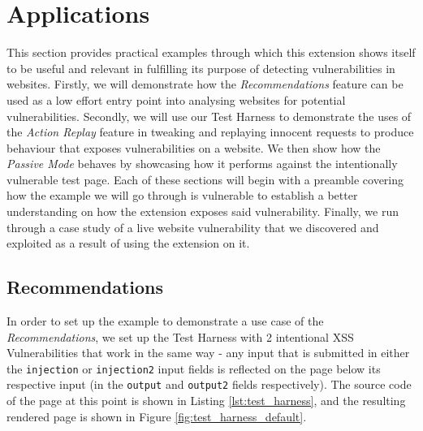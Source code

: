 \chapter{Applications}

This section provides practical examples through which this extension shows itself to be useful and relevant in fulfilling its purpose of detecting vulnerabilities in websites. Firstly, we will demonstrate how the \textit{Recommendations} feature can be used as a low effort entry point into analysing websites for potential vulnerabilities. Secondly, we will use our Test Harness to demonstrate the uses of the \textit{Action Replay} feature in tweaking and replaying innocent requests to produce behaviour that exposes vulnerabilities on a website. We then show how the \textit{Passive Mode} behaves by showcasing how it performs against the intentionally vulnerable test page. Each of these sections will begin with a preamble covering how the example we will go through is vulnerable to establish a better understanding on how the extension exposes said vulnerability. Finally, we run through a case study of a live website vulnerability that we discovered and exploited as a result of using the extension on it.

\section{Recommendations} \label{applications_recommendations}

In order to set up the example to demonstrate a use case of the \textit{Recommendations}, we set up the Test Harness with 2 intentional XSS Vulnerabilities that work in the same way - any input that is submitted in either the \texttt{injection} or \texttt{injection2} input fields is reflected on the page below its respective input (in the \texttt{output} and \texttt{output2} fields respectively). The source code of the page at this point is shown in Listing \ref{lst:test_harness}, and the resulting rendered page is shown in Figure \ref{fig:test_harness_default}. \\


